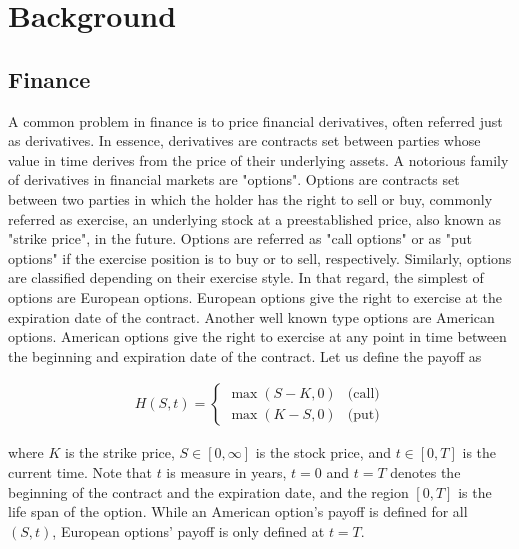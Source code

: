 
\section{Background} \label{sec:_background}

\subsection{Finance}

A common problem in finance is to price financial derivatives, often referred just
as derivatives. In essence, derivatives are contracts set between parties 
whose value in time derives from the price of their underlying assets. A notorious
family of derivatives in financial markets are "options". Options
are contracts set between two parties in which the holder has the right 
to sell or buy, commonly referred as exercise, an underlying stock at a preestablished price, 
also known as "strike price", in the future. Options are referred as "call options" 
or as "put options" if the exercise position is to buy or to sell, respectively. 
Similarly, options are classified depending on their exercise style. In that regard,
the simplest of options are European options. European options give the right 
to exercise at the expiration date of the contract. Another well known type options 
are American options. American options give the right to exercise at any 
point in time between the beginning and expiration date of the contract. 
Let us define the payoff as

\begin{align}
  H(S,t) = \begin{cases}
    \max(S - K, 0) & \text{(call)}\\ 
     \max(K - S, 0) & \text{(put)}
   \end{cases}
\end{align}

where $K$ is the strike price, $S\in[0,\infty]$ is the stock price, and 
$t \in [0, T]$ is the current time. Note that $t$ is measure in years, $t=0$ and $t=T$
denotes the beginning of the contract and the expiration date, and
the region $[0,T]$ is the life span of the option. While an American option's payoff
is defined for all $(S,t)$, European options' payoff is only defined at $t=T$.   

